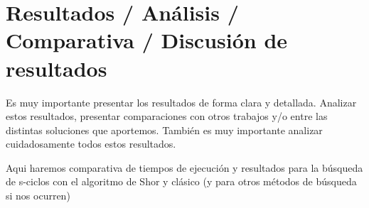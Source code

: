 \chapter{Resultados / Análisis / Comparativa / Discusión de resultados}
Es muy importante presentar los resultados de forma clara y detallada. Analizar estos resultados, presentar comparaciones con otros trabajos y/o entre las distintas soluciones que aportemos. También es muy importante analizar cuidadosamente todos estos resultados.


Aqui haremos comparativa de tiempos de ejecución y resultados para la búsqueda de s-ciclos con el algoritmo de Shor y clásico (y para otros métodos de búsqueda si nos ocurren)